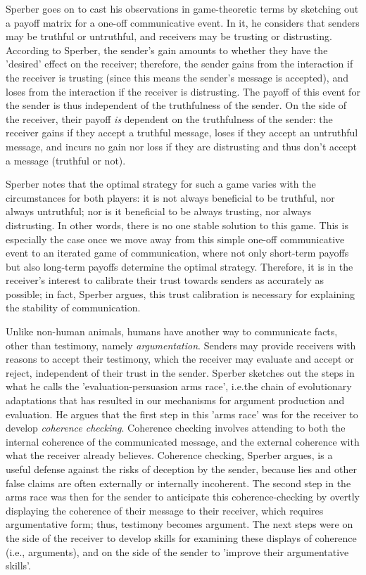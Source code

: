 Sperber goes on to cast his observations in game-theoretic terms by sketching out a payoff matrix for a one-off communicative event. In it, he considers that senders may be truthful or untruthful, and receivers may be trusting or distrusting. According to Sperber, the sender's gain amounts to whether they have the 'desired' effect on the receiver; therefore, the sender gains from the interaction if the receiver is trusting (since this means the sender's message is accepted), and loses from the interaction if the receiver is distrusting. The payoff of this event for the sender is thus independent of the truthfulness of the sender. On the side of the receiver, their payoff \emph{is} dependent on the truthfulness of the sender: the receiver gains if they accept a truthful message, loses if they accept an untruthful message, and incurs no gain nor loss if they are distrusting and thus don't accept a message (truthful or not).

Sperber notes that the optimal strategy for such a game varies with the circumstances for both players: it is not always beneficial to be truthful, nor always untruthful; nor is it beneficial to be always trusting, nor always distrusting. In other words, there is no one stable solution to this game.
This is especially the case once we move away from this simple one-off communicative event to an iterated game of communication, where not only short-term payoffs but also long-term payoffs determine the optimal strategy.
Therefore, it is in the receiver's interest to calibrate their trust towards senders as accurately as possible; in fact, Sperber argues, this trust calibration is necessary for explaining the stability of communication.

Unlike non-human animals, humans have another way to communicate facts, other than testimony, namely \emph{argumentation}. Senders may provide receivers with reasons to accept their testimony, which the receiver may evaluate and accept or reject, independent of their trust in the sender.
Sperber sketches out the steps in what he calls the 'evaluation-persuasion arms race', i.e.\@ the chain of evolutionary adaptations that has resulted in our mechanisms for argument production and evaluation.
He argues that the first step in this 'arms race' was for the receiver to develop \emph{coherence checking}. Coherence checking involves attending to both the internal coherence of the communicated message, and the external coherence with what the receiver already believes. Coherence checking, Sperber argues, is a useful defense against the risks of deception by the sender, because lies and other false claims are often externally or internally incoherent.
The second step in the arms race was then for the sender to anticipate this coherence-checking by overtly displaying the coherence of their message to their receiver, which requires argumentative form; thus, testimony becomes argument. The next steps were on the side of the receiver to develop skills for examining these displays of coherence (i.e., arguments), and on the side of the sender to 'improve their argumentative skills'.

